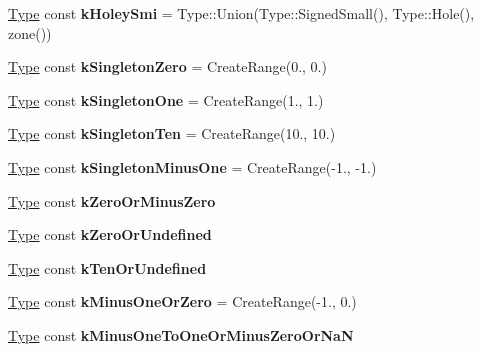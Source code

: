 \begin{DoxyCompactItemize}
\mbox{\hyperlink{classv8_1_1internal_1_1compiler_1_1Type}{Type}} const {\bfseries k\+Holey\+Smi} = Type\+::\+Union(Type\+::\+Signed\+Small(), Type\+::\+Hole(), zone())
\item 
\mbox{\label{classv8_1_1internal_1_1compiler_1_1TypeCache_af936773d743a44130b40d95b71aa1e4d}} 
\mbox{\hyperlink{classv8_1_1internal_1_1compiler_1_1Type}{Type}} const {\bfseries k\+Singleton\+Zero} = Create\+Range(0., 0.)
\item 
\mbox{\label{classv8_1_1internal_1_1compiler_1_1TypeCache_af8eff711759428a9ccca60774ad420bc}} 
\mbox{\hyperlink{classv8_1_1internal_1_1compiler_1_1Type}{Type}} const {\bfseries k\+Singleton\+One} = Create\+Range(1., 1.)
\item 
\mbox{\label{classv8_1_1internal_1_1compiler_1_1TypeCache_afd183eb397b2c6788f6a5b46aca7222f}} 
\mbox{\hyperlink{classv8_1_1internal_1_1compiler_1_1Type}{Type}} const {\bfseries k\+Singleton\+Ten} = Create\+Range(10., 10.)
\item 
\mbox{\label{classv8_1_1internal_1_1compiler_1_1TypeCache_a3c9c69c125cf02f9694d3d26f13e1447}} 
\mbox{\hyperlink{classv8_1_1internal_1_1compiler_1_1Type}{Type}} const {\bfseries k\+Singleton\+Minus\+One} = Create\+Range(-\/1., -\/1.)
\item 
\mbox{\hyperlink{classv8_1_1internal_1_1compiler_1_1Type}{Type}} const {\bfseries k\+Zero\+Or\+Minus\+Zero}
\item 
\mbox{\hyperlink{classv8_1_1internal_1_1compiler_1_1Type}{Type}} const {\bfseries k\+Zero\+Or\+Undefined}
\item 
\mbox{\hyperlink{classv8_1_1internal_1_1compiler_1_1Type}{Type}} const {\bfseries k\+Ten\+Or\+Undefined}
\item 
\mbox{\label{classv8_1_1internal_1_1compiler_1_1TypeCache_ac220dafd78984a0bc05db6efe978fc4c}} 
\mbox{\hyperlink{classv8_1_1internal_1_1compiler_1_1Type}{Type}} const {\bfseries k\+Minus\+One\+Or\+Zero} = Create\+Range(-\/1., 0.)
\item 
\mbox{\hyperlink{classv8_1_1internal_1_1compiler_1_1Type}{Type}} const {\bfseries k\+Minus\+One\+To\+One\+Or\+Minus\+Zero\+Or\+NaN}

\end{DoxyCompactItemize}
